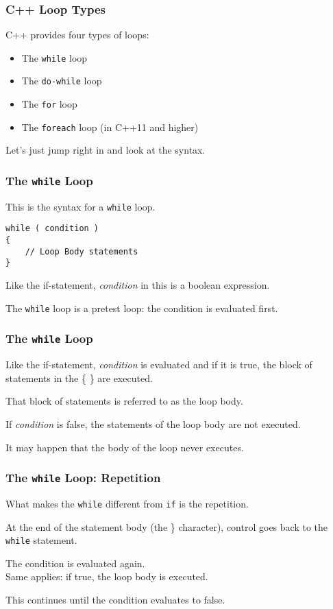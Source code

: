 \begin{frame}
\frametitle{C++ Loop Types}
C++ provides four types of loops:

\begin{itemize}
\item The \texttt{while} loop
\item The \texttt{do-while} loop
\item The \texttt{for} loop
\item The \texttt{foreach} loop (in C++11 and higher)
\end{itemize}

Let's just jump right in and look at the syntax.

\end{frame}

\begin{frame}[fragile]
\frametitle{The \texttt{while} Loop}

This is the syntax for a \texttt{while} loop.

\begin{verbatim}
while ( condition ) 
{
    // Loop Body statements
}
\end{verbatim}

Like the if-statement, \textit{condition} in this is a boolean expression.

The \texttt{while} loop is a pretest loop: the condition is evaluated first.

\end{frame}

\begin{frame}
\frametitle{The \texttt{while} Loop}

Like the if-statement, \textit{condition} is evaluated and if it is true, the block of statements in the \{ \} are executed.

That block of statements is referred to as the \alert{loop body}.

If \textit{condition} is false, the statements of the loop body are not executed.

It may happen that the body of the loop never executes.



\end{frame}

\begin{frame}
\frametitle{The \texttt{while} Loop: Repetition}

What makes the \texttt{while} different from \texttt{if} is the \alert{repetition}.

At the end of the statement body (the \} character), control goes back to the \texttt{while} statement.

The condition is evaluated again.\\
	\quad Same applies: if true, the loop body is executed.
	
This continues until the condition evaluates to false.


\end{frame}



